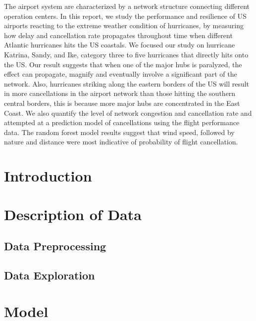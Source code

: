 \documentclass[12pt]{article}
\begin{document}
The airport system are characterized by a network structure connecting different operation centers. In this report, we study the performance and resilience of US airports reacting to the extreme weather condition of hurricanes, by measuring how delay and cancellation rate propagates throughout time when different Atlantic hurricanes hits the US coastals. We focused our study on hurricane Katrina, Sandy, and Ike, category three to five hurricanes that directly hits onto the US. Our result suggests that when one of the major hubs is paralyzed, the effect can propagate, magnify and eventually involve a significant part of the network. Also, hurricanes striking along the eastern borders of the US will result in more cancellations in the airport network than those hitting the southern central borders, this is because more major hubs are concentrated in the East Coast. We also quantify the level of network congestion and cancellation rate and attempted at a prediction model of cancellations using the flight performance data. The random forest model results suggest that wind speed, followed by nature and distance were most indicative of probability of flight cancellation. 

\section{Introduction} \label{sec:Intro}



\section{Description of Data} \label{sec:Descript} 

\subsection{Data Preprocessing}


\subsection{Data Exploration}


\section{Model} \label{sec:Model}

\end{document}
